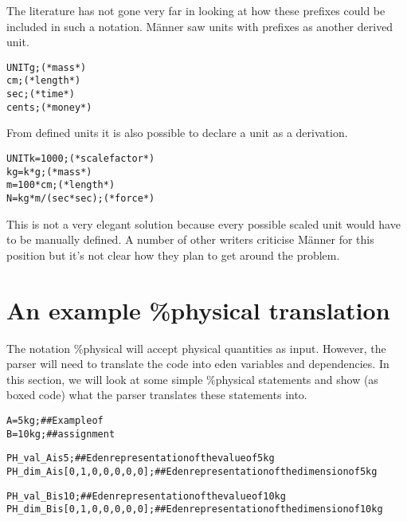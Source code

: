 \documentclass[a4paper]{article}
\newenvironment{boxcode}{\begin{lrbox}{\savepar}
	\begin{minipage}[b]{\textwidth}\begin{alltt}}
{\end{alltt}\end{minipage}\end{lrbox}\fbox{\usebox{\savepar}}\ \\}
\begin{document}
The literature has not gone very far in looking at how these prefixes could be 
included in such a notation.
M\"{a}nner \cite{ME_manner} saw units with prefixes as another derived unit.

\begin{alltt}
UNIT g;        (* mass    *)
     cm;       (* length  *)
     sec;      (* time    *)
     cents;    (* money   *)
     \hfill\cite[page 14]{ME_manner}
\end{alltt}

From defined units it is also possible to declare a unit as a derivation.

\begin{alltt}
UNIT k  = 1000;                  (* scale factor    *)
     kg = k * g;                 (* mass            *)
     m  = 100 * cm;              (* length          *)
     N  = kg * m/(sec * sec);    (* force           *)
     \hfill\cite[page 14]{ME_manner}
\end{alltt}

This is not a very elegant solution because every possible scaled unit would 
have to be manually defined.
A number of other writers criticise M\"anner for this position but it's not 
clear how they plan to get around the problem.
	
\section{An example \%physical translation \label{translations}}

The notation \%physical will accept physical quantities as input. However, the
parser will need to translate the code into eden variables and dependencies.
In this section, we will look at some simple \%physical statements and show (as 
boxed code)
what the parser translates these statements into.

\begin{alltt}
%physical
A = 5 kg;     ## Example of %physical
B = 10 kg;    ##  assignment
\end{alltt}
\begin{boxcode}
PH_val_A is 5;                 ## Eden representation of the value of 5 kg
PH_dim_A is [0,1,0,0,0,0,0];   ## Eden representation of the dimension of 5 kg

PH_val_B is 10;                ## Eden representation of the value of 10 kg    
PH_dim_B is [0,1,0,0,0,0,0];   ## Eden representation of the dimension of 10 kg
\end{boxcode}
\end{document}
